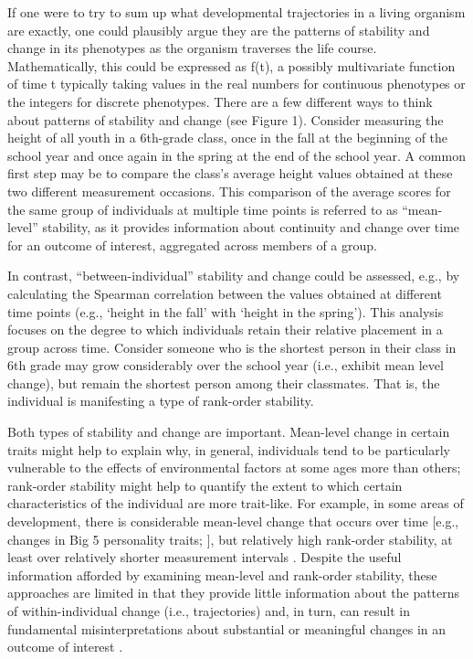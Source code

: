 \documentclass[
  number,
  preprint,
  3p,
  twocolumn]{elsarticle}
\begin{document}
If one were to try to sum up what developmental trajectories in a living
organism are exactly, one could plausibly argue they are the patterns of
stability and change in its phenotypes as the organism traverses the
life course. Mathematically, this could be expressed as f(t), a possibly
multivariate function of time t typically taking values in the real
numbers for continuous phenotypes or the integers for discrete
phenotypes. There are a few different ways to think about patterns of
stability and change (see Figure 1). Consider measuring the height of
all youth in a 6th-grade class, once in the fall at the beginning of the
school year and once again in the spring at the end of the school year.
A common first step may be to compare the class's average height values
obtained at these two different measurement occasions. This comparison
of the average scores for the same group of individuals at multiple time
points is referred to as ``mean-level'' stability, as it provides
information about continuity and change over time for an outcome of
interest, aggregated across members of a group.

In contrast, ``between-individual'' stability and change could be
assessed, e.g., by calculating the Spearman correlation between the
values obtained at different time points (e.g., `height in the fall'
with `height in the spring'). This analysis focuses on the degree to
which individuals retain their relative placement in a group across
time. Consider someone who is the shortest person in their class in 6th
grade may grow considerably over the school year (i.e., exhibit mean
level change), but remain the shortest person among their classmates.
That is, the individual is manifesting a type of rank-order stability.

Both types of stability and change are important. Mean-level change in
certain traits might help to explain why, in general, individuals tend
to be particularly vulnerable to the effects of environmental factors at
some ages more than others; rank-order stability might help to quantify
the extent to which certain characteristics of the individual are more
trait-like. For example, in some areas of development, there is
considerable mean-level change that occurs over time {[}e.g., changes in
Big 5 personality traits; \citep{bleidorn2022}{]}, but relatively high
rank-order stability, at least over relatively shorter measurement
intervals \citep{bleidorn2022, roberts2000, roberts2006}. Despite the
useful information afforded by examining mean-level and rank-order
stability, these approaches are limited in that they provide little
information about the patterns of within-individual change (i.e.,
trajectories) and, in turn, can result in fundamental misinterpretations
about substantial or meaningful changes in an outcome of interest
\citep{curran2011}.
\end{document}
